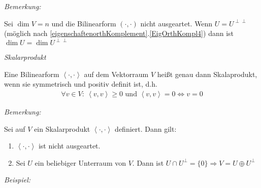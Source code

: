 \textit{Bemerkung:}

Sei $\dim V = n$ und die Bilinearform $(\cdot , \cdot)$ nicht ausgeartet.
Wenn $U = U^{\perp \perp}$ (möglich nach \ref{eigenschaftenorthKomplement}.\ref{EigOrthKompl4}) dann ist $\dim U = \dim U^{\perp\perp}$


\begin{mydef}\label{skalarprodukte} \textit{Skalarprodukt}

    Eine Bilinearform $\left\langle \cdot , \cdot \right\rangle$ auf dem Vektorraum $V$ heißt genau dann Skalaprodukt,
    wenn sie symmetrisch und positiv definit ist, d.h.
    \begin{align*}
        \forall v\in V : \ \left\langle v, v \right\rangle \geq 0 \text{ und } \left\langle v, v \right\rangle = 0 \Leftrightarrow v = 0
    \end{align*}
\end{mydef}

\textit{Bemerkung:}

Sei auf $V$ ein Skalarprodukt $\left\langle \cdot , \cdot \right\rangle$  definiert.
Dann gilt:
\begin{enumerate}
    \item $\left\langle \cdot ,  \cdot \right\rangle$ ist nicht ausgeartet.
    \item Sei $U$ ein beliebiger Unterraum von $V$. Dann ist $U \cap U^{\perp} = \{ 0 \} \Rightarrow V = U \oplus U^{\perp}$
\end{enumerate}


\textit{Beispiel:}

